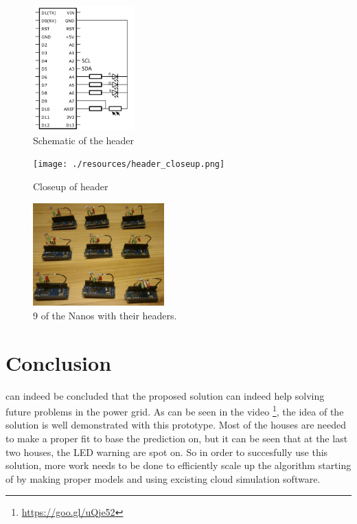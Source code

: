 \documentclass[a4paper,journal]{DDREAM}
\begin{document}
\begin{figure}[H]
\centering
    \includegraphics[width=0.35\textwidth]{./resources/schematic.png}
    \caption{Schematic of the header}
    \label{fig:schematic}
\end{figure}

\begin{figure}[H]
\centering
    \texttt{[image: ./resources/header\_closeup.png]}
    \caption{Closeup of header}
    \label{fig:header}
\end{figure}


\begin{figure}[H]
\centering
    \includegraphics[width=0.45\textwidth]{./resources/nanos.jpg}
    \caption{9 of the Nanos with their headers.}
    \label{fig:nanos}
\end{figure}

\section{Conclusion}\label{sec:conclusion}
 can indeed be concluded that the proposed solution can indeed help solving future problems in the power grid.
As can be seen in the video \footnote{\url{https://goo.gl/uQje52}}, the idea of the solution is well demonstrated with this prototype.
Most of the houses are needed to make a proper fit to base the prediction on, but it can be seen that at the last two houses, the LED warning are spot on.
So in order to succesfully use this solution, more work needs to be done to efficiently scale up the algorithm starting of by making proper models and using excisting cloud simulation software.
\end{document}
